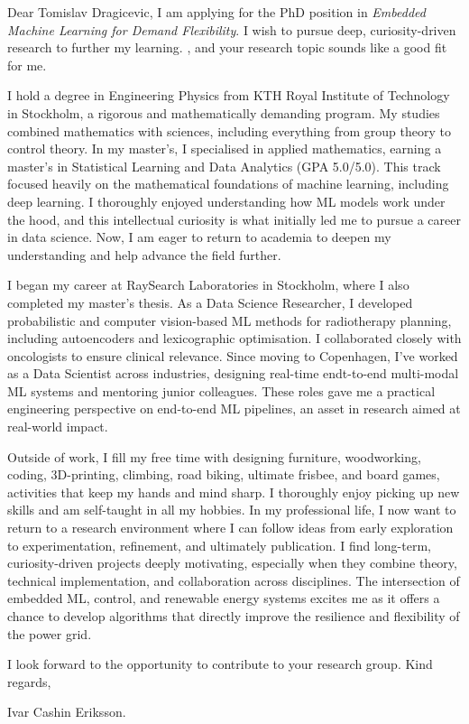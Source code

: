 \documentclass[11pt,a4paper]{moderncv}
\begin{document}
\makecvtitle
Dear Tomislav Dragicevic, I am applying for the PhD position in \textit{Embedded Machine Learning for Demand Flexibility}. I wish to pursue deep, curiosity-driven research to further my learning. , and your research topic sounds like a good fit for me.

\hspace*{2em}
I hold a degree in Engineering Physics from KTH Royal Institute of Technology in Stockholm, a rigorous and mathematically demanding program. My studies combined mathematics with sciences, including everything from group theory to control theory. In my master's, I specialised in applied mathematics, earning a master's in Statistical Learning and Data Analytics (GPA 5.0/5.0). This track focused heavily on the mathematical foundations of machine learning, including deep learning. I thoroughly enjoyed understanding how ML models work under the hood, and this intellectual curiosity is what initially led me to pursue a career in data science. Now, I am eager to return to academia to deepen my understanding and help advance the field further.

\hspace*{2em}
I began my career at RaySearch Laboratories in Stockholm, where I also completed my master's thesis. As a Data Science Researcher, I developed probabilistic and computer vision-based ML methods for radiotherapy planning, including autoencoders and lexicographic optimisation. I collaborated closely with oncologists to ensure clinical relevance. Since moving to Copenhagen, I've worked as a Data Scientist across industries, designing real-time endt-to-end multi-modal ML systems and mentoring junior colleagues. These roles gave me a practical engineering perspective on end-to-end ML pipelines, an asset in research aimed at real-world impact.

\hspace*{2em}
Outside of work, I fill my free time with designing furniture, woodworking, coding, 3D-printing, climbing, road biking, ultimate frisbee, and board games, activities that keep my hands and mind sharp. I thoroughly enjoy picking up new skills and am self-taught in all my hobbies. In my professional life, I now want to return to a research environment where I can follow ideas from early exploration to experimentation, refinement, and ultimately publication. I find long-term, curiosity-driven projects deeply motivating, especially when they combine theory, technical implementation, and collaboration across disciplines. The intersection of embedded ML, control, and renewable energy systems excites me as it offers a chance to develop algorithms that directly improve the resilience and flexibility of the power grid.

\vspace{8 mm}
I look forward to the opportunity to contribute to your research group. Kind regards,

\vspace{3 mm} 
Ivar Cashin Eriksson.
\end{document}
